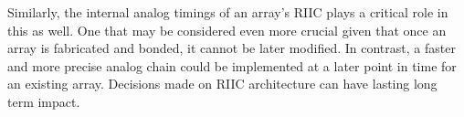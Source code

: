 Similarly, the internal analog timings of an array's RIIC plays a critical role in this as well. One that may be considered even more crucial given that once an array is fabricated and bonded, it cannot be later modified. In contrast, a faster and more precise analog chain could be implemented at a later point in time for an existing array. Decisions made on RIIC architecture can have lasting long term impact.
